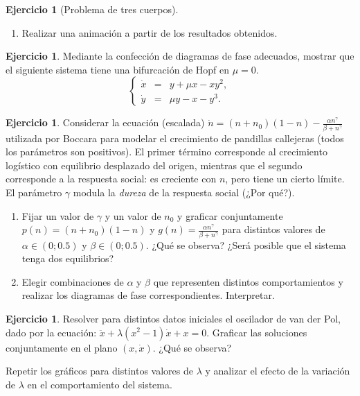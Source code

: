\documentclass[12pt, a4paper]{amsbook}
\theoremstyle{remark}
\theoremstyle{definition}
\newtheorem{ejer}[teo]{Ejercicio}
\numberwithin{section}{chapter}
\numberwithin{subsection}{section}
\numberwithin{equation}{section}
\numberwithin{figure}{chapter}
\begin{document}
\begin{ejer}[Problema de tres cuerpos]
\begin{enumerate}
Con las masas y datos iniciales dados resolver las ecuaciones en un intervalo de tiempo que abarque $365$ días. 

\item Realizar una animación a partir de los resultados obtenidos. 
\end{enumerate}
\end{ejer}





\begin{ejer}
Mediante la confección de diagramas de fase adecuados, mostrar que el siguiente sistema tiene una bifurcación de Hopf en $\mu=0$.
\[\left\{ \begin{array}{lcr}
    \dot{x} &=& y+\mu x-xy^2, \\
    \dot{y} &=& \mu y - x - y^3.
\end{array}\right.\]

\end{ejer}



\begin{ejer} 
Considerar la ecuación (escalada) $\dot{n} = (n+n_0)(1-n)-\frac{\alpha n^\gamma}{\beta+n^\gamma}$ utilizada por Boccara para modelar el crecimiento de pandillas callejeras (todos los parámetros son positivos). El primer término corresponde al crecimiento logístico con equilibrio desplazado del origen, mientras que el segundo corresponde a la respuesta social: es creciente con $n$, pero tiene un cierto límite. El parámetro $\gamma$ modula la \emph{dureza} de la respuesta social (¿Por qué?). 
\begin{enumerate}
\item Fijar un valor de $\gamma$ y un valor de $n_0$ y graficar conjuntamente $p(n) = (n+n_0)(1-n)$ y $g(n)=\frac{\alpha n^\gamma}{\beta+n^\gamma}$ para distintos valores de $\alpha\in(0;0.5)$ y $\beta\in(0;0.5)$. ¿Qué se observa? ¿Será posible que el sistema tenga dos equilibrios?
\item Elegir combinaciones de $\alpha$ y $\beta$ que representen distintos comportamientos y realizar los diagramas de fase correspondientes. Interpretar.
\end{enumerate}
\end{ejer}
\begin{ejer}
Resolver para distintos datos iniciales el oscilador de van der Pol, dado por la ecuación: $\ddot{x}+\lambda(x^2-1)\dot{x}+x=0$. Graficar las soluciones conjuntamente en el plano $(x,\dot{x})$. ¿Qué se observa?

Repetir los gráficos para distintos valores de $\lambda$ y analizar el efecto de la variación de $\lambda$ en el comportamiento del sistema.
\end{ejer}
\end{document}

